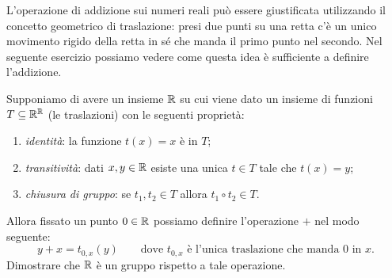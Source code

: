 
L'operazione di addizione sui numeri reali può essere giustificata 
utilizzando il concetto geometrico di traslazione:
presi due punti su una retta c'è un unico movimento 
rigido della retta in sé che manda il primo punto nel secondo.
Nel seguente esercizio possiamo vedere come questa 
idea è sufficiente a definire l'addizione.
%
\begin{exercise}[traslazioni su $\RR$]
Supponiamo di avere un insieme $\RR$ su cui viene dato un insieme 
di funzioni $T\subseteq {\mathbb R}^{\mathbb R}$ (le traslazioni) con le seguenti 
proprietà:
\begin{enumerate}
  \item \emph{identità}: la funzione $t(x)=x$ è in $T$;
  \item \emph{transitività}: dati $x,y\in {\mathbb R}$ esiste una unica $t\in T$ tale che $t(x)=y$;
  \item \emph{chiusura di gruppo}: se $t_1,t_2\in T$ allora $t_1\circ t_2 \in T$.
\end{enumerate}
Allora fissato un punto $0\in {\mathbb R}$ possiamo definire l'operazione $+$ 
nel modo seguente:
\[
    y + x = t_{0,x}(y) \qquad\text{dove $t_{0,x}$ è l'unica traslazione 
    che manda $0$ in $x$}.
\]  
Dimostrare che $\RR$ è un gruppo rispetto a tale operazione.
\end{exercise}
%
